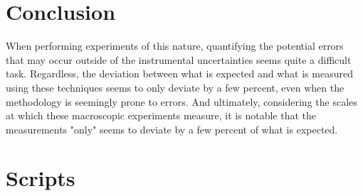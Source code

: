 \documentclass[11pt,a4paper]{article}
\begin{document}
\section{\label{sect:conclusion}Conclusion}
  When performing experiments of this nature, quantifying the potential errors that may occur outside of the instrumental uncertainties seems quite a difficult task. Regardless, the deviation between what is expected and what is measured using these techniques seems to only deviate by a few percent, even when the methodology is seemingly prone to errors. And ultimately, considering the scales at which these macroscopic experiments measure, it is notable that the measurements "only" seems to deviate by a few percent of what is expected.





\appendix*
\section{Scripts\label{app:scripts}}


\end{document}
